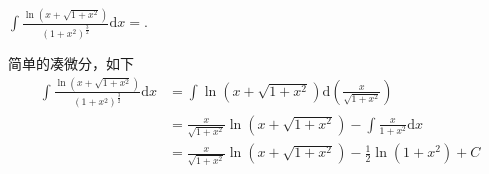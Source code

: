 \documentclass[hideanswer=false,
	enfont=newtxtext,
	zhfont=empty,
	mathfont=newtxmath,
]{cmcthesis}
\begin{document}
\wq $\int{\frac{\ln\left(x+\sqrt{1+x^2}\right)}{\left(1+x^2\right)^{\frac{3}{2}}}}\mathrm{d}x=$\underline{\hspace{3em}}.\\
	\begin{answer}
	\begin{solution}
简单的凑微分，如下
\begin{align*}
	\int{\frac{\ln\left(x+\sqrt{1+x^2}\right)}{\left(1+x^2\right)^{\frac{3}{2}}}}\mathrm{d}x&=\int{\ln\left(x+\sqrt{1+x^2}\right)}\mathrm{d}\left(\frac{x}{\sqrt{1+x^2}}\right)\\
	&=\frac{x}{\sqrt{1+x^2}}\ln\left(x+\sqrt{1+x^2}\right)-\int{\frac{x}{1+x^2}\mathrm{d}x}\\
	&=\frac{x}{\sqrt{1+x^2}}\ln\left(x+\sqrt{1+x^2}\right)-\frac{1}{2}\ln\left(1+x^2\right)+C
\end{align*}
	\end{solution}
	\end{answer}
\end{document}
